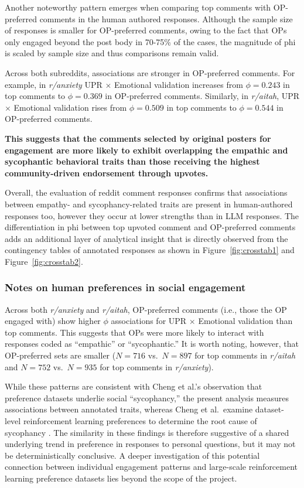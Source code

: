 \smallskip Another noteworthy pattern emerges when comparing top comments with OP-preferred comments in the human authored responses. Although the sample size of responses is smaller for OP-preferred comments, owing to the fact that OPs only engaged beyond the post body in 70-75\% of the cases, the magnitude of phi is scaled by sample size and thus comparisons remain valid. 

\smallskip Across both subreddits, associations are stronger in OP-preferred comments. For example, in \textit{r/anxiety} UPR $\times$ Emotional validation increases from $\phi = 0.243$ in top comments to $\phi = 0.369$ in OP-preferred comments. Similarly, in \textit{r/aitah}, UPR $\times$ Emotional validation rises from $\phi = 0.509$ in top comments to $\phi = 0.544$ in OP-preferred comments. 

\smallskip \textbf{This suggests that the comments selected by original posters for engagement are more likely to exhibit overlapping the empathic and sycophantic behavioral traits than those receiving the highest community-driven endorsement through upvotes.}

\bigskip Overall, the evaluation of reddit comment responses confirms that associations between empathy- and sycophancy-related traits are present in human-authored responses too, however they occur at lower strengths than in LLM responses. The differentiation in phi between top upvoted comment and OP-preferred comments adds an additional layer of analytical insight that is directly observed from the contingency tables of annotated responses as shown in Figure~\ref{fig:crosstab1} and Figure~\ref{fig:crosstab2}.

\subsubsection{Notes on human preferences in social engagement}

Across both \textit{r/anxiety} and \textit{r/aitah}, OP-preferred comments (i.e., those the OP engaged with) show higher $\phi$ associations for UPR $\times$ Emotional validation than top comments. This suggests that OPs were more likely to interact with responses coded as ``empathic'' or ``sycophantic.'' It is worth noting, however, that OP-preferred sets are smaller ($N = 716$ vs.\ $N = 897$ for top comments in \textit{r/aitah} and $N = 752$ vs.\ $N = 935$ for top comments in \textit{r/anxiety}).

While these patterns are consistent with Cheng et al.'s observation that preference datasets underlie social ``sycophancy,'' the present analysis measures associations between annotated traits, whereas Cheng et al.\ examine dataset-level reinforcement learning preferences to determine the root cause of sycophancy \cite{cheng-etal-sycophancy}. The similarity in these findings is therefore suggestive of a shared underlying trend in preference in responses to personal questions, but it may not be deterministically conclusive. A deeper investigation of this potential connection between individual engagement patterns and large-scale reinforcement learning preference datasets lies beyond the scope of the project.


